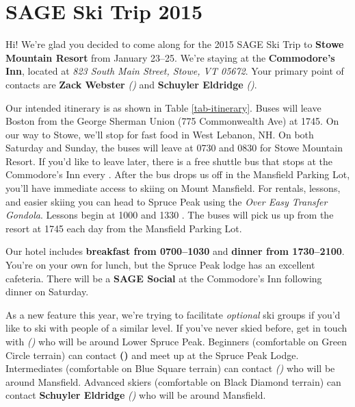 

\usepackage[scaled]{helvet}
\renewcommand\familydefault{\sfdefault}
\usepackage[top=2cm,bottom=2cm,outer=0.5in,inner=0.5in,landscape]{geometry}
\usepackage{multicol}

\pagestyle{empty}


\twocolumn

\section*{SAGE Ski Trip 2015}
Hi!
We're glad you decided to come along for the 2015 SAGE Ski Trip to \textbf{Stowe Mountain Resort} from January 23--25.
We're staying at the \textbf{Commodore's Inn}, located at \emph{823 South Main Street, Stowe, VT 05672}.
Your primary point of contacts are \textbf{Zack Webster} \emph{(\missingdata)} and \textbf{Schuyler Eldridge} \emph{(\missingdata)}.

Our intended itinerary is as shown in Table \ref{tab-itinerary}.
Buses will leave Boston from the George Sherman Union (775 Commonwealth Ave) at 1745.
On our way to Stowe, we'll stop for fast food in West Lebanon, NH.
On both Saturday and Sunday, the buses will leave at 0730 and 0830 for Stowe Mountain Resort.
If you'd like to leave later, there is a free shuttle bus that stops at the Commodore's Inn every .
After the bus drops us off in the Mansfield Parking Lot, you'll have immediate access to skiing on Mount Mansfield.
For rentals, lessons, and easier skiing you can head to Spruce Peak using the \emph{Over Easy Transfer Gondola}.
Lessons begin at 1000 and 1330 .
The buses will pick us up from the resort at 1745 each day from the Mansfield Parking Lot.

Our hotel includes \textbf{breakfast from 0700--1030} and \textbf{dinner from 1730--2100}.
You're on your own for lunch, but the Spruce Peak lodge has an excellent cafeteria.
There will be a \textbf{SAGE Social} at the Commodore's Inn following dinner on Saturday.

As a new feature this year, we're trying to facilitate \emph{optional} ski groups if you'd like to ski with people of a similar level.
If you've never skied before, get in touch with \textbf{\missingdata} \emph{()} who will be around Lower Spruce Peak.
Beginners (comfortable on Green Circle terrain) can contact \textbf{()} and meet up at the Spruce Peak Lodge.
Intermediates (comfortable on Blue Square terrain) can contact \textbf{\missingdata} \emph{()} who will be around Mansfield.
Advanced skiers (comfortable on Black Diamond terrain) can contact \textbf{Schuyler Eldridge} \emph{(\missingdata)} who will be around Mansfield.

